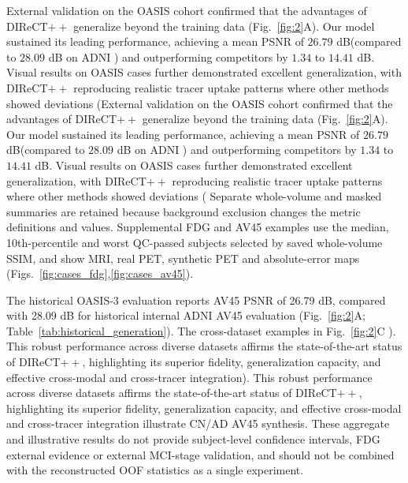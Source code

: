 \documentclass{article}
\providecommand{\DIFaddtex}[1]{{\protect\color{blue} \sf #1}} %
\providecommand{\DIFdeltex}[1]{{\protect\color{red} \ifmmode #1\else\scriptsize #1\fi}} %
\providecommand{\DIFaddbegin}{} %
\providecommand{\DIFaddend}{} %
\providecommand{\DIFdelbegin}{} %
\providecommand{\DIFdelend}{} %
\providecommand{\DIFadd}[1]{\texorpdfstring{\DIFaddtex{#1}}{#1}} %
\providecommand{\DIFdel}[1]{\texorpdfstring{\DIFdeltex{#1}}{}} %
\newcommand{\DIFscaledelfig}{0.5}
\newlength{\DIFdelgraphicswidth} %
\newlength{\DIFdelgraphicsheight} %
\newcommand{\DIFaddincludegraphics}[2][]{{\color{blue}\fbox{\DIFOincludegraphics[#1]{#2}}}} %
\newcommand{\DIFdelincludegraphics}[2][]{%
\sbox{\DIFdelgraphicsbox}{\DIFOincludegraphics[#1]{#2}}%
\settoboxwidth{\DIFdelgraphicswidth}{\DIFdelgraphicsbox} %
\settoboxtotalheight{\DIFdelgraphicsheight}{\DIFdelgraphicsbox} %
\scalebox{\DIFscaledelfig}{%
\parbox[b]{\DIFdelgraphicswidth}{\usebox{\DIFdelgraphicsbox}\\[-\baselineskip] \rule{\DIFdelgraphicswidth}{0em}}\llap{\resizebox{\DIFdelgraphicswidth}{\DIFdelgraphicsheight}{%
\setlength{\unitlength}{\DIFdelgraphicswidth}%
\begin{picture}(1,1)%
\thicklines\linethickness{2pt} %
{\color[rgb]{1,0,0}\put(0,0){\framebox(1,1){}}}%
{\color[rgb]{1,0,0}\put(0,0){\line( 1,1){1}}}%
{\color[rgb]{1,0,0}\put(0,1){\line(1,-1){1}}}%
\end{picture}%
}\hspace*{3pt}}} %
} %
\DeclareRobustCommand{\DIFaddbegin}{\DIFOaddbegin \let\includegraphics\DIFaddincludegraphics} %
\DeclareRobustCommand{\DIFaddend}{\DIFOaddend \let\includegraphics\DIFOincludegraphics} %
\DeclareRobustCommand{\DIFdelbegin}{\DIFOdelbegin \let\includegraphics\DIFdelincludegraphics} %
\DeclareRobustCommand{\DIFdelend}{\DIFOaddend \let\includegraphics\DIFOincludegraphics} %
\begin{document}
\DIFdelbegin \DIFdel{External validation on the OASIS cohort confirmed that the advantages of DIReCT$++$ generalize beyond the training data (Fig.~\ref{fig:2}A).
Our model sustained its leading performance, achieving a mean PSNR of $26.79$ dB(compared to $28.09$ dB on ADNI ) and outperforming competitors by $1.34$ to $14.41$ dB. Visual results on OASIS cases further demonstrated excellent generalization, with DIReCT$++$ reproducing realistic tracer uptake patterns where other methods showed deviations (}\DIFdelend \DIFaddbegin \DIFadd{Separate whole-volume and masked summaries are retained because background exclusion changes the metric definitions and values. Supplemental FDG and AV45 examples use the median, 10th-percentile and worst QC-passed subjects selected by saved whole-volume SSIM, and show MRI, real PET, synthetic PET and absolute-error maps (Figs.~\ref{fig:cases_fdg},\ref{fig:cases_av45}).
}

\DIFadd{The historical OASIS-3 evaluation reports AV45 PSNR of 26.79 dB, compared with 28.09 dB for historical internal ADNI AV45 evaluation (Fig.~\ref{fig:2}A; Table~\ref{tab:historical_generation}). The cross-dataset examples in }\DIFaddend Fig.~\ref{fig:2}C \DIFdelbegin \DIFdel{). This robust performance across diverse datasets affirms the state-of-the-art status of DIReCT$++$, highlighting its superior fidelity, generalization capacity, and effective cross-modal and cross-tracer integration}\DIFdelend \DIFaddbegin \DIFadd{illustrate CN/AD AV45 synthesis. These aggregate and illustrative results do not provide subject-level confidence intervals, FDG external evidence or external MCI-stage validation, and should not be combined with the reconstructed OOF statistics as a single experiment}\DIFaddend .
\end{document}
